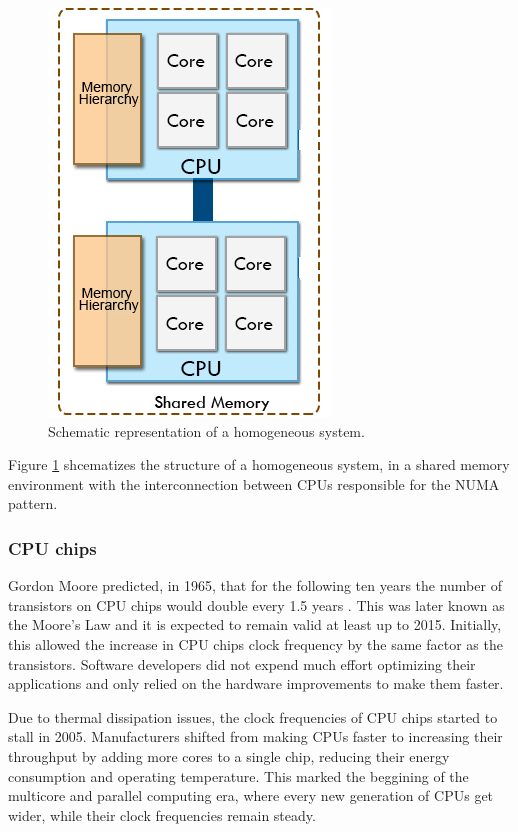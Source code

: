 \begin{figure}[!htp]
	\begin{center}
		\includegraphics[scale=0.4]{../../common/img/homoplats.png}
		\caption{Schematic representation of a homogeneous system.}
		\label{fig:HomogeneousSystem}
	\end{center}
\end{figure}

Figure \ref{fig:HomogeneousSystem} shcematizes the structure of a homogeneous system, in a shared memory environment with the interconnection between CPUs responsible for the NUMA pattern.

\subsubsection*{CPU chips}
\label{CPUChips}

Gordon Moore predicted, in 1965, that for the following ten years the number of transistors on CPU chips would double every 1.5 years \cite{MooreLaw}. This was later known as the Moore's Law and it is expected to remain valid at least up to 2015. Initially, this allowed the increase in CPU chips clock frequency by the same factor as the transistors. Software developers did not expend much effort optimizing their applications and only relied on the hardware improvements to make them faster.

Due to thermal dissipation issues, the clock frequencies of CPU chips started to stall in 2005. Manufacturers shifted from making CPUs faster to increasing their throughput by adding more cores to a single chip, reducing their energy consumption and operating temperature. This marked the beggining of the multicore and parallel computing era, where every new generation of CPUs get wider, while their clock frequencies remain steady.

